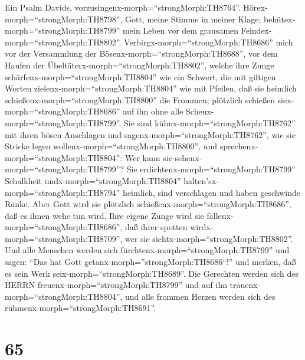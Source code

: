  Ein Psalm Davids,
vorzusingenx-morph=``strongMorph:TH8764''.
Hörex-morph=``strongMorph:TH8798'', Gott, meine Stimme in meiner Klage;
behütex-morph=``strongMorph:TH8799'' mein Leben vor dem grausamen
Feindex-morph=``strongMorph:TH8802''. 
Verbirgx-morph=``strongMorph:TH8686'' mich vor der Versammlung der
Bösenx-morph=``strongMorph:TH8688'', vor dem Haufen der
Übeltäterx-morph=``strongMorph:TH8802'',  welche ihre Zunge
schärfenx-morph=``strongMorph:TH8804'' wie ein Schwert, die mit giftigen
Worten zielenx-morph=``strongMorph:TH8804'' wie mit Pfeilen,
 daß sie heimlich schießenx-morph=``strongMorph:TH8800'' die
Frommen; plötzlich schießen siex-morph=``strongMorph:TH8686'' auf ihn
ohne alle Scheux-morph=``strongMorph:TH8799''.  Sie sind
kühnx-morph=``strongMorph:TH8762'' mit ihren bösen Anschlägen und
sagenx-morph=``strongMorph:TH8762'', wie sie Stricke legen
wollenx-morph=``strongMorph:TH8800'', und
sprechenx-morph=``strongMorph:TH8804'': Wer kann sie
sehenx-morph=``strongMorph:TH8799''?  Sie
erdichtenx-morph=``strongMorph:TH8799'' Schalkheit
undx-morph=``strongMorph:TH8804'' halten'sx-morph=``strongMorph:TH8794''
heimlich, sind verschlagen und haben geschwinde Ränke.  Aber
Gott wird sie plötzlich schießenx-morph=``strongMorph:TH8686'', daß es
ihnen wehe tun wird.  Ihre eigene Zunge wird sie
fällenx-morph=``strongMorph:TH8686'', daß ihrer spotten
wirdx-morph=``strongMorph:TH8709'', wer sie
siehtx-morph=``strongMorph:TH8802''.  Und alle Menschen
werden sich fürchtenx-morph=``strongMorph:TH8799'' und sagen: ``Das hat
Gott getanx-morph=''strongMorph:TH8686``!'' und merken, daß es sein Werk
seix-morph=``strongMorph:TH8689''.  Die Gerechten werden
sich des HERRN freuenx-morph=``strongMorph:TH8799'' und auf ihn
trauenx-morph=``strongMorph:TH8804'', und alle frommen Herzen werden
sich des rühmenx-morph=``strongMorph:TH8691''.

\hypertarget{section-64}{%
\section{65}\label{section-64}}

